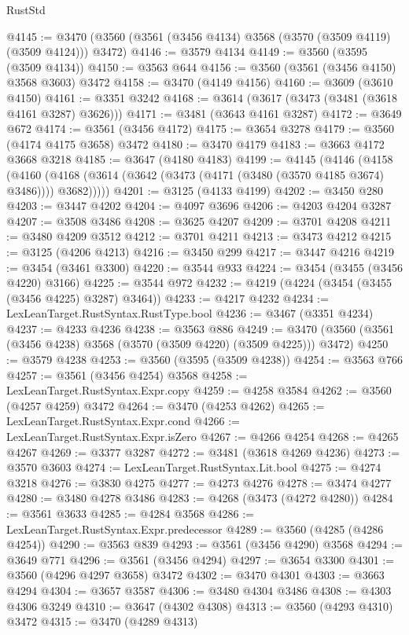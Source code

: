 \begin{lexlean}{RustStd}
\begin{coremodule}
@4145 := @3470 (@3560 (@3561 (@3456 @4134) @3568 (@3570 (@3509 @4119) (@3509 @4124))) @3472)
@4146 := @3579 @4134
@4149 := @3560 (@3595 (@3509 @4134))
@4150 := @3563 @644
@4156 := @3560 (@3561 (@3456 @4150) @3568 @3603) @3472
@4158 := @3470 (@4149 @4156)
@4160 := @3609 (@3610 @4150)
@4161 := @3351 @3242
@4168 := @3614 (@3617 (@3473 (@3481 (@3618 @4161 @3287) @3626)))
@4171 := @3481 (@3643 @4161 @3287)
@4172 := @3649 @672
@4174 := @3561 (@3456 @4172)
@4175 := @3654 @3278
@4179 := @3560 (@4174 @4175 @3658) @3472
@4180 := @3470 @4179
@4183 := @3663 @4172 @3668 @3218
@4185 := @3647 (@4180 @4183)
@4199 := @4145
    (@4146
      (@4158
        (@4160 (@4168 (@3614 (@3642 (@3473 (@4171 (@3480 (@3570 @4185 @3674) @3486)))) @3682)))))
@4201 := @3125 (@4133 @4199)
@4202 := @3450 @280
@4203 := @3447 @4202
@4204 := @4097 @3696
@4206 := @4203 @4204 @3287
@4207 := @3508 @3486
@4208 := @3625 @4207
@4209 := @3701 @4208
@4211 := @3480 @4209 @3512
@4212 := @3701 @4211
@4213 := @3473 @4212
@4215 := @3125 (@4206 @4213)
@4216 := @3450 @299
@4217 := @3447 @4216
@4219 := @3454 (@3461 @3300)
@4220 := @3544 @933
@4224 := @3454 (@3455 (@3456 @4220) @3166)
@4225 := @3544 @972
@4232 := @4219 (@4224 (@3454 (@3455 (@3456 @4225) @3287) @3464))
@4233 := @4217 @4232
@4234 := LexLeanTarget.RustSyntax.RustType.bool
@4236 := @3467 (@3351 @4234)
@4237 := @4233 @4236
@4238 := @3563 @886
@4249 := @3470 (@3560 (@3561 (@3456 @4238) @3568 (@3570 (@3509 @4220) (@3509 @4225))) @3472)
@4250 := @3579 @4238
@4253 := @3560 (@3595 (@3509 @4238))
@4254 := @3563 @766
@4257 := @3561 (@3456 @4254) @3568
@4258 := LexLeanTarget.RustSyntax.Expr.copy
@4259 := @4258 @3584
@4262 := @3560 (@4257 @4259) @3472
@4264 := @3470 (@4253 @4262)
@4265 := LexLeanTarget.RustSyntax.Expr.cond
@4266 := LexLeanTarget.RustSyntax.Expr.isZero
@4267 := @4266 @4254
@4268 := @4265 @4267
@4269 := @3377 @3287
@4272 := @3481 (@3618 @4269 @4236)
@4273 := @3570 @3603
@4274 := LexLeanTarget.RustSyntax.Lit.bool
@4275 := @4274 @3218
@4276 := @3830 @4275
@4277 := @4273 @4276
@4278 := @3474 @4277
@4280 := @3480 @4278 @3486
@4283 := @4268 (@3473 (@4272 @4280))
@4284 := @3561 @3633
@4285 := @4284 @3568
@4286 := LexLeanTarget.RustSyntax.Expr.predecessor
@4289 := @3560 (@4285 (@4286 @4254))
@4290 := @3563 @839
@4293 := @3561 (@3456 @4290) @3568
@4294 := @3649 @771
@4296 := @3561 (@3456 @4294)
@4297 := @3654 @3300
@4301 := @3560 (@4296 @4297 @3658) @3472
@4302 := @3470 @4301
@4303 := @3663 @4294
@4304 := @3657 @3587
@4306 := @3480 @4304 @3486
@4308 := @4303 @4306 @3249
@4310 := @3647 (@4302 @4308)
@4313 := @3560 (@4293 @4310) @3472
@4315 := @3470 (@4289 @4313)

\end{coremodule}
\end{lexlean}
